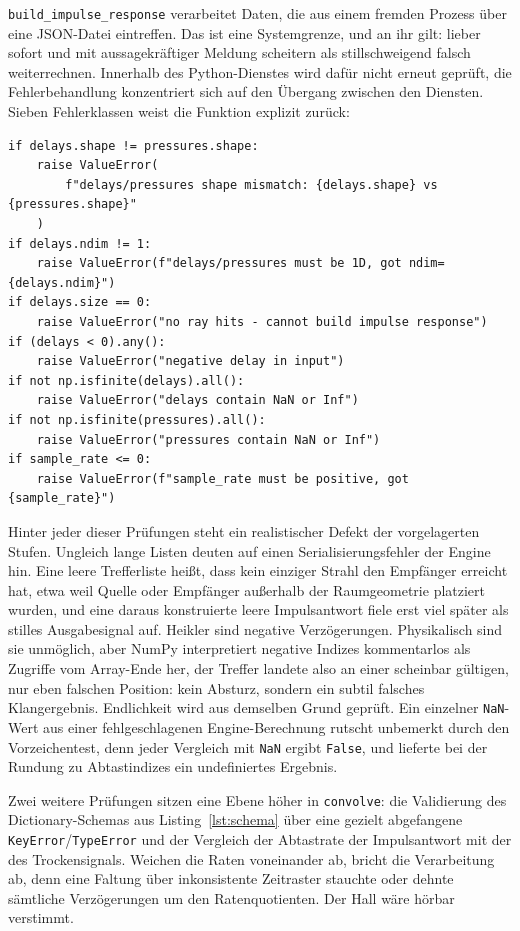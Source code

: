 \texttt{build\_impulse\_response} verarbeitet Daten, die aus einem fremden
Prozess über eine JSON-Datei eintreffen. Das ist eine Systemgrenze, und an ihr
gilt: lieber sofort und mit aussagekräftiger Meldung scheitern als
stillschweigend falsch weiterrechnen. Innerhalb des Python-Dienstes wird dafür
nicht erneut geprüft, die Fehlerbehandlung konzentriert sich auf den Übergang
zwischen den Diensten. Sieben Fehlerklassen weist die Funktion explizit
zurück:

\begin{lstlisting}[style=cemdsp, caption={Eingabevalidierung an der Systemgrenze zur Rust-Engine.}, label={lst:validierung}]
if delays.shape != pressures.shape:
    raise ValueError(
        f"delays/pressures shape mismatch: {delays.shape} vs {pressures.shape}"
    )
if delays.ndim != 1:
    raise ValueError(f"delays/pressures must be 1D, got ndim={delays.ndim}")
if delays.size == 0:
    raise ValueError("no ray hits - cannot build impulse response")
if (delays < 0).any():
    raise ValueError("negative delay in input")
if not np.isfinite(delays).all():
    raise ValueError("delays contain NaN or Inf")
if not np.isfinite(pressures).all():
    raise ValueError("pressures contain NaN or Inf")
if sample_rate <= 0:
    raise ValueError(f"sample_rate must be positive, got {sample_rate}")
\end{lstlisting}

Hinter jeder dieser Prüfungen steht ein realistischer Defekt der vorgelagerten
Stufen. Ungleich lange Listen deuten auf einen Serialisierungsfehler der Engine
hin. Eine leere Trefferliste heißt, dass kein einziger Strahl den Empfänger
erreicht hat, etwa weil Quelle oder Empfänger außerhalb der Raumgeometrie
platziert wurden, und eine daraus konstruierte leere Impulsantwort fiele erst
viel später als stilles Ausgabesignal auf. Heikler sind negative Verzögerungen.
Physikalisch sind sie unmöglich, aber NumPy interpretiert negative Indizes
kommentarlos als Zugriffe vom Array-Ende her, der Treffer landete also an einer
scheinbar gültigen, nur eben falschen Position: kein Absturz, sondern ein
subtil falsches Klangergebnis. Endlichkeit wird aus demselben Grund geprüft.
Ein einzelner \texttt{NaN}-Wert aus einer fehlgeschlagenen Engine-Berechnung
rutscht unbemerkt durch den Vorzeichentest, denn jeder Vergleich mit
\texttt{NaN} ergibt \texttt{False}, und lieferte bei der Rundung zu
Abtastindizes ein undefiniertes Ergebnis.

Zwei weitere Prüfungen sitzen eine Ebene höher in \texttt{convolve}: die
Validierung des Dictionary-Schemas aus Listing~\ref{lst:schema} über eine
gezielt abgefangene \texttt{KeyError}/\texttt{TypeError} und der Vergleich der
Abtastrate der Impulsantwort mit der des Trockensignals. Weichen die Raten
voneinander ab, bricht die Verarbeitung ab, denn eine Faltung über
inkonsistente Zeitraster stauchte oder dehnte sämtliche Verzögerungen um den
Ratenquotienten. Der Hall wäre hörbar verstimmt.

